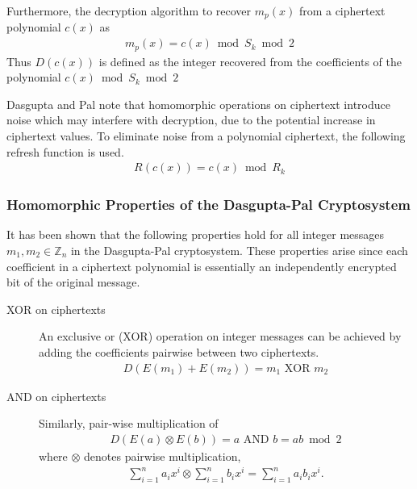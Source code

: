 Furthermore, the decryption algorithm to recover $m_p(x)$ from a ciphertext polynomial $c(x)$ as
\begin{align*}
	m_p(x) = c(x) \bmod S_k \bmod 2
\end{align*}
Thus $D(c(x))$ is defined as the integer recovered from the coefficients of the polynomial $c(x) \bmod S_k \bmod 2$

Dasgupta and Pal note that homomorphic operations on ciphertext introduce noise which may interfere with decryption, due to the potential increase in ciphertext values.
To eliminate noise from a polynomial ciphertext, the following refresh function is used.
\begin{align*}
	R(c(x)) = c(x) \bmod R_k
\end{align*}

\subsubsection{Homomorphic Properties of the Dasgupta-Pal Cryptosystem}
It has been shown \cite{dasgupta_design_2016} that the following properties hold for all integer messages $m_1, m_2 \in \mathbb{Z}_n$ in the Dasgupta-Pal cryptosystem. These properties arise since each coefficient in a ciphertext polynomial is essentially an independently encrypted bit of the original message.
\begin{description}
	\item[XOR on ciphertexts]
	An exclusive or (XOR) operation on integer messages can be achieved by adding the coefficients pairwise between two ciphertexts.
	\begin{align*}
		D(E(m_1)+E(m_2)) = m_1 \text{ XOR } m_2
	\end{align*}
	\item[AND on ciphertexts]
	Similarly, pair-wise multiplication of
	\begin{align*}
		D(E(a) \otimes E(b)) = a \text{ AND } b = ab \bmod 2
	\end{align*}
	where $\otimes$ denotes pairwise multiplication,
	\begin{align*}
		\sum_{i=1}^n{a_ix^i} \otimes \sum_{i=1}^n{b_ix^i} = \sum_{i=1}^n{a_ib_ix^i}.
	\end{align*}
\end{description}
